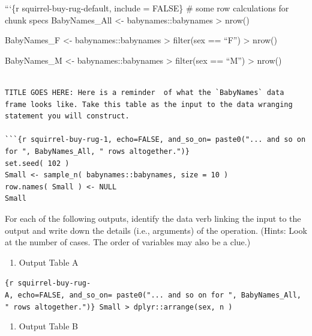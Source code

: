 \documentclass[
  letterpaper,
  DIV=11,
  numbers=noendperiod,
  oneside]{scrartcl}
\providecommand{\tightlist}{%
  \setlength{\itemsep}{0pt}\setlength{\parskip}{0pt}}\usepackage{longtable,booktabs,array}
\begin{document}
\begin{tcolorbox}[enhanced jigsaw, colbacktitle=quarto-callout-note-color!10!white, opacityback=0, breakable, opacitybacktitle=0.6, colback=white, coltitle=black, arc=.35mm, title=\textcolor{quarto-callout-note-color}{\faInfo}\hspace{0.5em}{Exercise 5.38 squirrel-by-rug}, left=2mm, colframe=quarto-callout-note-color-frame, rightrule=.15mm, bottomrule=.15mm, leftrule=.75mm, bottomtitle=1mm, toptitle=1mm, titlerule=0mm, toprule=.15mm]

```\{r squirrel-buy-rug-default, include = FALSE\} \# some row
calculations for chunk specs BabyNames\_All \textless-
babynames::babynames \textbar\textgreater{} nrow()

BabyNames\_F \textless- babynames::babynames \textbar\textgreater{}
filter(sex == ``F'') \textbar\textgreater{} nrow()

BabyNames\_M \textless- babynames::babynames \textbar\textgreater{}
filter(sex == ``M'') \textbar\textgreater{} nrow()

\begin{verbatim}

TITLE GOES HERE: Here is a reminder  of what the `BabyNames` data frame looks like. Take this table as the input to the data wranging statement you will construct.   

```{r squirrel-buy-rug-1, echo=FALSE, and_so_on= paste0("... and so on for ", BabyNames_All, " rows altogether.")}
set.seed( 102 )
Small <- sample_n( babynames::babynames, size = 10 )
row.names( Small ) <- NULL
Small 
\end{verbatim}

For each of the following outputs, identify the data verb linking the
input to the output and write down the details (i.e., arguments) of the
operation. (Hints: Look at the number of cases. The order of variables
may also be a clue.)

\begin{enumerate}
\def\labelenumi{\arabic{enumi}.}
\tightlist
\item
  Output Table A
\end{enumerate}

\texttt{\{r\ squirrel-buy-rug-A,\ echo=FALSE,\ and\_so\_on=\ paste0("...\ and\ so\ on\ for\ ",\ BabyNames\_All,\ "\ rows\ altogether.")\}\ Small\ \textbar{}\textgreater{}\ dplyr::arrange(sex,\ n\ )}

\begin{enumerate}
\def\labelenumi{\arabic{enumi}.}
\setcounter{enumi}{1}
\tightlist
\item
  Output Table B
\end{enumerate}


\end{tcolorbox}
\end{document}
